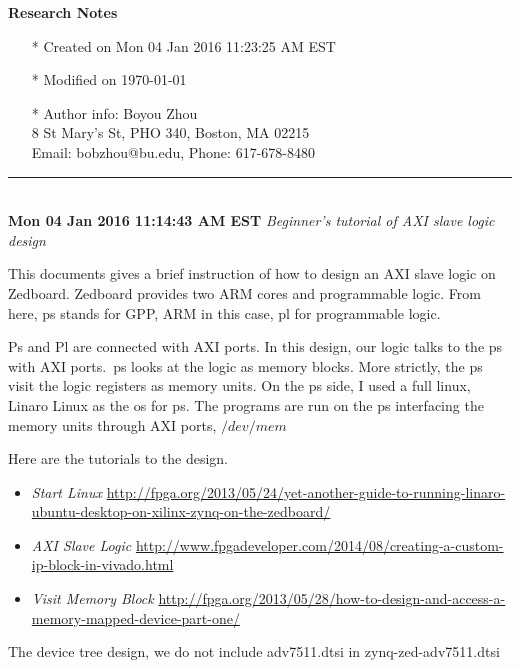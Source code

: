 \documentclass[]{article}
\begin{document}
\pagestyle{empty}
{\large\textbf{Research Notes}}
\begin{itemize}
    \item[*] Created on Mon 04 Jan 2016 11:23:25 AM EST
    \item[*] Modified on \today
    \item[*] Author info: Boyou Zhou\\
             8 St Mary's St, PHO 340, Boston, MA 02215\\
             Email: bobzhou@bu.edu, Phone: 617-678-8480\\
\end{itemize}

\rule[-0.1cm]{7.5in}{0.01cm}\\
\noindent \textbf{Mon 04 Jan 2016 11:14:43 AM EST}
\textit{Beginner's tutorial of AXI slave logic design}

This documents gives a brief instruction of how to design an AXI slave logic on
Zedboard. Zedboard provides two ARM cores and programmable logic. From here, ps
stands for GPP, ARM in this case, pl for programmable logic.\ 

Ps and Pl are connected with AXI ports. In this design, our logic talks to the
ps with AXI ports.\ ps looks at the logic as memory blocks. More strictly, the ps
visit the logic registers as memory units. On the ps side, I used a full linux,
Linaro Linux as the os for ps. The programs are run on the ps interfacing the
memory units through AXI ports, $/dev/mem$

Here are the tutorials to the design.
\indent		\begin{itemize}
			\item \textit{Start Linux}
			\url{http://fpga.org/2013/05/24/yet-another-guide-to-running-linaro-ubuntu-desktop-on-xilinx-zynq-on-the-zedboard/}
			\item \textit{AXI Slave Logic}
			\url{http://www.fpgadeveloper.com/2014/08/creating-a-custom-ip-block-in-vivado.html}
			\item \textit{Visit Memory Block}
			\url{http://fpga.org/2013/05/28/how-to-design-and-access-a-memory-mapped-device-part-one/}
        \end{itemize}

The device tree design, we do not include adv7511.dtsi in zynq-zed-adv7511.dtsi
\end{document}
